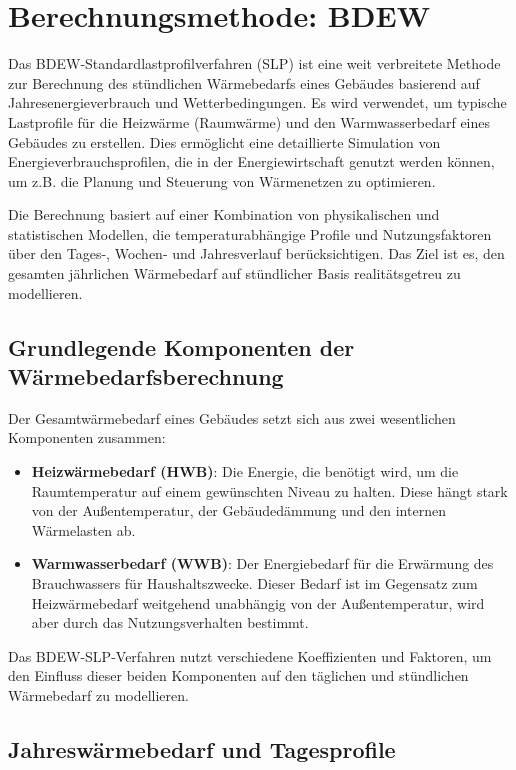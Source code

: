 \section{Berechnungsmethode: BDEW}
\label{sec:heat_load_BDEW_doc}

Das BDEW-Standardlastprofilverfahren (SLP) ist eine weit verbreitete Methode zur Berechnung des stündlichen Wärmebedarfs eines Gebäudes basierend auf Jahresenergieverbrauch und Wetterbedingungen. Es wird verwendet, um typische Lastprofile für die Heizwärme (Raumwärme) und den Warmwasserbedarf eines Gebäudes zu erstellen. Dies ermöglicht eine detaillierte Simulation von Energieverbrauchsprofilen, die in der Energiewirtschaft genutzt werden können, um z.B. die Planung und Steuerung von Wärmenetzen zu optimieren.

Die Berechnung basiert auf einer Kombination von physikalischen und statistischen Modellen, die temperaturabhängige Profile und Nutzungsfaktoren über den Tages-, Wochen- und Jahresverlauf berücksichtigen. Das Ziel ist es, den gesamten jährlichen Wärmebedarf auf stündlicher Basis realitätsgetreu zu modellieren.

\subsection{Grundlegende Komponenten der Wärmebedarfsberechnung}
Der Gesamtwärmebedarf eines Gebäudes setzt sich aus zwei wesentlichen Komponenten zusammen:

\begin{itemize}
    \item \textbf{Heizwärmebedarf (HWB)}: Die Energie, die benötigt wird, um die Raumtemperatur auf einem gewünschten Niveau zu halten. Diese hängt stark von der Außentemperatur, der Gebäudedämmung und den internen Wärmelasten ab.
    \item \textbf{Warmwasserbedarf (WWB)}: Der Energiebedarf für die Erwärmung des Brauchwassers für Haushaltszwecke. Dieser Bedarf ist im Gegensatz zum Heizwärmebedarf weitgehend unabhängig von der Außentemperatur, wird aber durch das Nutzungsverhalten bestimmt.
\end{itemize}

Das BDEW-SLP-Verfahren nutzt verschiedene Koeffizienten und Faktoren, um den Einfluss dieser beiden Komponenten auf den täglichen und stündlichen Wärmebedarf zu modellieren.

\subsection{Jahreswärmebedarf und Tagesprofile}

